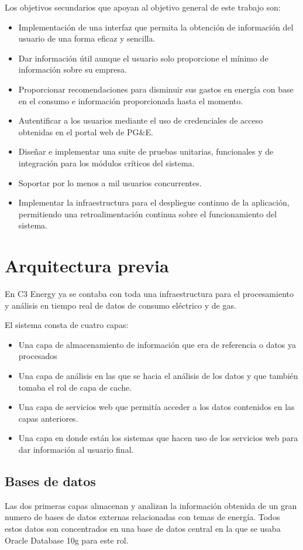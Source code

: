 Los objetivos secundarios que apoyan al objetivo general de este trabajo son:
\begin{itemize}
\item Implementación de una interfaz que permita la obtención
  de información del usuario de una forma eficaz y sencilla.
\item Dar información útil aunque el usuario solo proporcione el
  mínimo de información sobre su empresa.
\item Proporcionar recomendaciones para disminuir sus
  gastos en energía con base en el consumo e información proporcionada
  hasta el momento.
\item Autentificar a los usuarios mediante el uso de credenciales de acceso
  obtenidas en el portal web de PG\&E.
\item Diseñar e implementar una suite de pruebas unitarias, funcionales
  y de integración para los módulos críticos del sistema.
\item Soportar por lo menos a mil usuarios concurrentes.
\item Implementar la infraestructura para el despliegue continuo de la
  aplicación, permitiendo una retroalimentación continua sobre el
  funcionamiento del sistema.
\end{itemize}

\section{Arquitectura previa}
En C3 Energy ya se contaba con toda una infraestructura para el
procesamiento y análisis en tiempo real de datos de consumo eléctrico
y de gas.

El sistema consta de cuatro capas:

\begin{itemize}
\item Una capa de almacenamiento de información que era de referencia
  o datos ya procesados
\item Una capa de análisis en las que se hacia el análisis de los datos
  y que también tomaba el rol de capa de cache.
\item Una capa de servicios web que permitía acceder a los datos contenidos
  en las capas anteriores.
\item Una capa en donde están los sistemas que hacen uso de los
  servicios web para dar información al usuario final.
\end{itemize}

\subsection{Bases de datos}
Las dos primeras capas almacenan y analizan la información obtenida
de un gran numero de bases de datos externas relacionadas con temas
de energía. Todos estos datos son concentrados en una base de datos
central en la que se usaba Oracle Database 10g para este rol.

